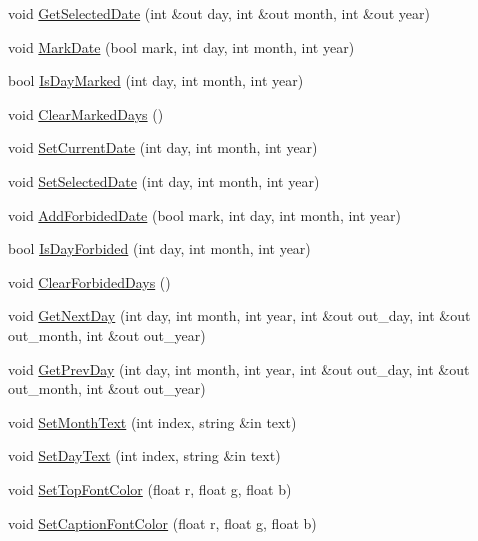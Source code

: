\begin{DoxyCompactItemize}
\item 
void \hyperlink{class_n_g_u_i_calendar_a5541e59843c3fa0f0e28b981929a889c}{Get\+Selected\+Date} (int \&out day, int \&out month, int \&out year)
\item 
void \hyperlink{class_n_g_u_i_calendar_a54a265f505a76f7797c10a53a1822f8f}{Mark\+Date} (bool mark, int day, int month, int year)
\item 
bool \hyperlink{class_n_g_u_i_calendar_aacea596c42008d27899da2b7efb88c50}{Is\+Day\+Marked} (int day, int month, int year)
\item 
void \hyperlink{class_n_g_u_i_calendar_a899d680f524432746ba24549d54ce858}{Clear\+Marked\+Days} ()
\item 
void \hyperlink{class_n_g_u_i_calendar_a5e297c7dc94c87539ba2bd477dc77ed8}{Set\+Current\+Date} (int day, int month, int year)
\item 
void \hyperlink{class_n_g_u_i_calendar_ab2238e8a500b9de87b67e8d5a05518c0}{Set\+Selected\+Date} (int day, int month, int year)
\item 
void \hyperlink{class_n_g_u_i_calendar_a642fd7d1b476856e425d555eb6c3fa12}{Add\+Forbided\+Date} (bool mark, int day, int month, int year)
\item 
bool \hyperlink{class_n_g_u_i_calendar_a1ec8c5a588d4dac1163780f853fc8821}{Is\+Day\+Forbided} (int day, int month, int year)
\item 
void \hyperlink{class_n_g_u_i_calendar_a5e15f28be7923927b8303819fa0c5131}{Clear\+Forbided\+Days} ()
\item 
void \hyperlink{class_n_g_u_i_calendar_ae8fcfb2d16f84fd474957fe8f581ef9d}{Get\+Next\+Day} (int day, int month, int year, int \&out out\+\_\+day, int \&out out\+\_\+month, int \&out out\+\_\+year)
\item 
void \hyperlink{class_n_g_u_i_calendar_a55e495051ab1e07cfa9ee2432115dd1e}{Get\+Prev\+Day} (int day, int month, int year, int \&out out\+\_\+day, int \&out out\+\_\+month, int \&out out\+\_\+year)
\item 
void \hyperlink{class_n_g_u_i_calendar_afce282f046e5fb08bdb6986ad409501d}{Set\+Month\+Text} (int index, string \&in text)
\item 
void \hyperlink{class_n_g_u_i_calendar_a65aa9a3b2e9ee559f92b206322d7c8d8}{Set\+Day\+Text} (int index, string \&in text)
\item 
void \hyperlink{class_n_g_u_i_calendar_aa86bd5e746ddf4bd0c4be93d30de5e0e}{Set\+Top\+Font\+Color} (float r, float g, float b)
\item 
void \hyperlink{class_n_g_u_i_calendar_a8b21f4f1913bb057e2faa43bfdb9e5be}{Set\+Caption\+Font\+Color} (float r, float g, float b)

\end{DoxyCompactItemize}
